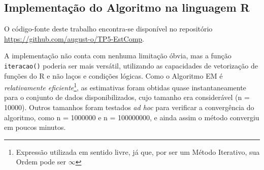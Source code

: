 \documentclass[
	article,			%
	11pt,				%
	oneside,			%
	a4paper,			%
	english,			%
	brazil,				%
	sumario=tradicional
	]{abntex2}
\begin{document}
\postextual






\begin{anexosenv}

\chapter{Implementação do Algoritmo na linguagem R}
\label{anexo:a}

O código-fonte deste trabalho encontra-se disponível no repositório \url{https://github.com/august-o/TP5-EstComp}.

A implementação não conta com nenhuma limitação óbvia, mas a função \texttt{iteracao()} poderia ser mais versátil, utilizando as capacidades de vetorização de funções do R e não laços e condições lógicas. Como o Algoritmo EM é \textit{relativamente eficiente}\footnote{Expressão utilizada em sentido livre, já que, por ser um Método Iterativo, sua Ordem pode ser $\infty$}, as estimativas foram obtidas quase instantaneamente para o conjunto de dados disponibilizados, cujo tamanho era considerável (n = 10000). Outros tamanhos foram testados \textit{ad hoc} para verificar a convergência do algoritmo, como n = 1000000 e n = 100000000, e ainda assim o método convergiu em poucos minutos.

\lstset{inputencoding=utf8/latin1}


\end{anexosenv}
\end{document}

